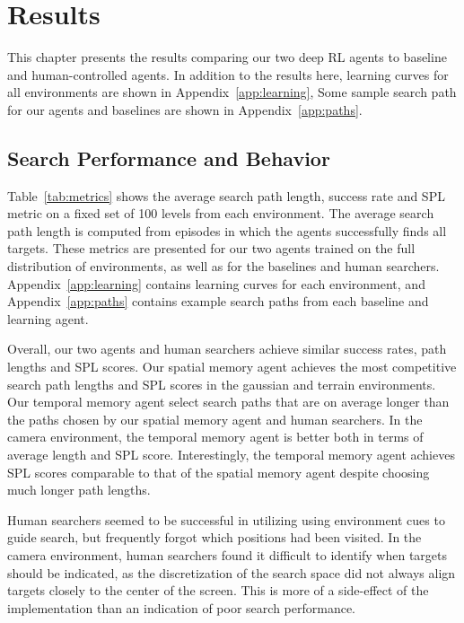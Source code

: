 \chapter{Results}
\label{cha:results}

This chapter presents the results comparing our two deep RL agents to baseline and human-controlled agents.
In addition to the results here, learning curves for all environments are shown in Appendix~\ref{app:learning},
Some sample search path for our agents and baselines are shown in Appendix~\ref{app:paths}.


\section{Search Performance and Behavior}

Table~\ref{tab:metrics} shows the average search path length, success rate and SPL metric on a fixed set of 100 levels from each environment.
The average search path length is computed from episodes in which the agents successfully finds all targets.
These metrics are presented for our two agents trained on the full distribution of environments, as well as for the baselines and human searchers.
Appendix~\ref{app:learning} contains learning curves for each environment, and Appendix~\ref{app:paths} contains example search paths from each baseline and learning agent. 

Overall, our two agents and human searchers achieve similar success rates, path lengths and SPL scores.
Our spatial memory agent achieves the most competitive search path lengths and SPL scores in the gaussian and terrain environments.
Our temporal memory agent select search paths that are on average longer than the paths chosen by our spatial memory agent and human searchers.
In the camera environment, the temporal memory agent is better both in terms of average length and SPL score.
Interestingly, the temporal memory agent achieves SPL scores comparable to that of the spatial memory agent despite choosing much longer path lengths.

Human searchers seemed to be successful in utilizing using environment cues to guide search, but frequently forgot which positions had been visited.
In the camera environment, human searchers found it difficult to identify when targets should be indicated,
as the discretization of the search space did not always align targets closely to the center of the screen.
This is more of a side-effect of the implementation than an indication of poor search performance.


